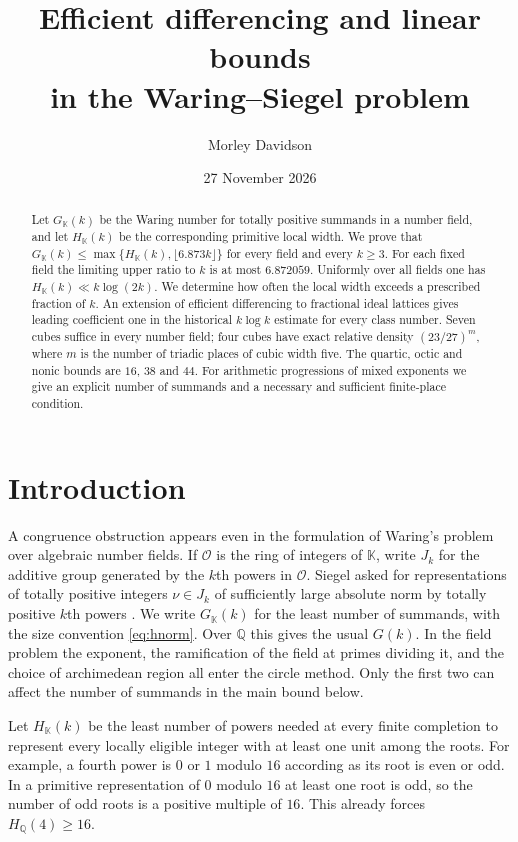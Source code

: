 \documentclass[11pt,letterpaper]{article}
\title{\textbf{Efficient differencing and linear bounds\\ in the Waring--Siegel problem}}
\author{Morley Davidson}
\date{27 November 2026}
\theoremstyle{definition}
\numberwithin{equation}{section}
\begin{document}
\maketitle
\begin{abstract}
Let $G_{\mathbb K}(k)$ be the Waring number for totally positive
summands in a number field, and let $H_{\mathbb K}(k)$ be the
corresponding primitive local width. We prove that
$G_{\mathbb K}(k)\le\max\{H_{\mathbb K}(k),\lfloor6.873k\rfloor\}$
for every field and every $k\ge3$. For each fixed field the limiting
upper ratio to $k$ is at most $6.872059$. Uniformly over all fields
one has $H_{\mathbb K}(k)\ll k\log(2k)$. We determine how often the
local width exceeds a prescribed fraction of $k$. An extension of
efficient differencing to fractional ideal lattices gives leading
coefficient one in the historical $k\log k$ estimate for every
class number. Seven cubes suffice in every number field; four cubes
have exact relative density $(23/27)^m$, where $m$ is the number of
triadic places of cubic width five. The quartic, octic and nonic
bounds are $16$, $38$ and $44$. For arithmetic progressions of mixed
exponents we give an explicit number of summands and a necessary and
sufficient finite-place condition.
\end{abstract}

\begingroup
\setlength{\parskip}{0pt}
\setcounter{tocdepth}{1}
\tableofcontents
\endgroup

\section{Introduction}\label{sec:intro}
A congruence obstruction appears even in the formulation of Waring's
problem over algebraic number fields. If $\mathcal O$ is the ring of
integers of $\mathbb K$, write $J_k$ for the additive group generated
by the $k$th powers in $\mathcal O$. Siegel asked for representations
of totally positive integers $\nu\in J_k$ of sufficiently large
absolute norm by totally positive $k$th powers
\cite{hsieg44,hsieg45}. We write $G_{\mathbb K}(k)$ for the least
number of summands, with the size convention \eqref{eq:hnorm}.
Over $\mathbb Q$ this gives the usual $G(k)$. In the field problem
the exponent, the ramification of the field at primes dividing it,
and the choice of archimedean region all enter the circle method.
Only the first two can affect the number of summands in the
main bound below.

Let $H_{\mathbb K}(k)$ be the least number of powers needed at every
finite completion to represent every locally eligible integer with at
least one unit among the roots. For example, a fourth power is $0$ or
$1$ modulo $16$ according as its root is even or odd. In a primitive
representation of $0$ modulo $16$ at least one root is odd, so the
number of odd roots is a positive multiple of $16$. This already
forces $H_{\mathbb Q}(4)\ge16$.
\end{document}

